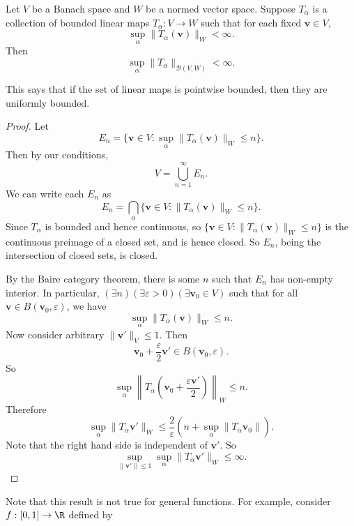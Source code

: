 \documentclass[a4paper]{article}
\begin{document}
\begin{thm}
  Let $V$ be a Banach space and $W$ be a normed vector space. Suppose $T_\alpha$ is a collection of bounded linear maps $T_\alpha: V\to W$ such that for each fixed $\mathbf{v} \in V$,
  \[
    \sup_\alpha \|T_\alpha (\mathbf{v})\|_W < \infty.
  \]
  Then
  \[
    \sup_\alpha \|T_\alpha\|_{\mathcal{B}(V, W)} < \infty.
  \]
\end{thm}
This says that if the set of linear maps is pointwise bounded, then they are uniformly bounded.
\begin{proof}
  Let
  \[
    E_n = \{\mathbf{v} \in V: \sup_\alpha \|T_\alpha(\mathbf{v})\|_W \leq n\}.
  \]
  Then by our conditions,
  \[
    V = \bigcup_{n = 1}^\infty E_n.
  \]
  We can write each $E_n$ as
  \[
    E_n = \bigcap_\alpha \{\mathbf{v} \in V: \|T_\alpha (\mathbf{v})\|_W \leq n\}.
  \]
  Since $T_\alpha$ is bounded and hence continuous, so $\{\mathbf{v} \in V: \|T_\alpha (\mathbf{v})\|_W\leq n\}$ is the continuous preimage of a closed set, and is hence closed. So $E_n$, being the intersection of closed sets, is closed.

  By the Baire category theorem, there is some $n$ such that $E_n$ has non-empty interior. In particular, $(\exists n) (\exists \varepsilon > 0)(\exists \mathbf{v}_0 \in V)$  such that for all $\mathbf{v}\in B(\mathbf{v}_0, \varepsilon)$, we have
  \[
    \sup_{\alpha} \|T_\alpha(\mathbf{v})\|_W \leq n.
  \]
  Now consider arbitrary $\|\mathbf{v}'\|_V \leq 1$. Then
  \[
    \mathbf{v}_0 + \frac{\varepsilon}{2} \mathbf{v}' \in B(\mathbf{v}_0, \varepsilon).
  \]
  So
  \[
    \sup_\alpha \left\|T_\alpha\left(\mathbf{v}_0 + \frac{\varepsilon \mathbf{v}'}{2}\right)\right\|_W \leq n.
  \]
  Therefore
  \[
    \sup_\alpha \|T_\alpha \mathbf{v}'\|_W \leq  \frac{2}{\varepsilon} \left(n + \sup_\alpha \|T_\alpha \mathbf{v}_0\|\right).
  \]
  Note that the right hand side is independent of $\mathbf{v}'$. So
  \[
    \sup_{\|\mathbf{v}'\| \leq 1}\sup_\alpha \|T_\alpha \mathbf{v}'\|_W \leq \infty.
  \]
\end{proof}
Note that this result is not true for general functions. For example, consider $f: [0, 1] \to \R$ defined by
\begin{center}
\end{center}
\end{document}
